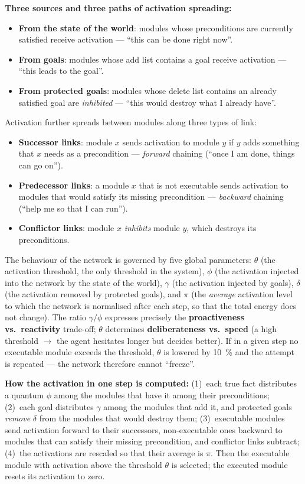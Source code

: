 \documentclass[11pt,a4paper]{article}
\theoremstyle{definition}
\providecommand{\uv}[1]{``#1''}
\begin{document}
\textbf{Three sources and three paths of activation spreading:}
\begin{itemize}
\item \textbf{From the state of the world}: modules whose preconditions are currently satisfied
  receive activation --- \uv{this can be done right now}.
\item \textbf{From goals}: modules whose add list contains a goal receive activation ---
  \uv{this leads to the goal}.
\item \textbf{From protected goals}: modules whose delete list contains an already satisfied goal are
  \emph{inhibited} --- \uv{this would destroy what I already have}.
\end{itemize}
Activation further spreads between modules along three types of link:
\begin{itemize}
\item \textbf{Successor links}: module $x$ sends activation to module $y$ if $y$ adds something that
  $x$ needs as a precondition --- \emph{forward} chaining (\uv{once I am done, things can go on}).
\item \textbf{Predecessor links}: a module $x$ that is not executable sends activation to modules
  that would satisfy its missing precondition --- \emph{backward} chaining (\uv{help me so that I can
  run}).
\item \textbf{Conflictor links}: module $x$ \emph{inhibits} module $y$, which destroys its
  preconditions.
\end{itemize}
The behaviour of the network is governed by five global parameters: $\theta$ (the activation
threshold, the only threshold in the system), $\phi$ (the activation injected into the network by the
state of the world), $\gamma$ (the activation injected by goals), $\delta$ (the activation removed by
protected goals), and $\pi$ (the \emph{average} activation level to which the network is normalised
after each step, so that the total energy does not change).
The ratio $\gamma/\phi$ expresses precisely the \textbf{proactiveness vs.\ reactivity} trade-off;
$\theta$ determines \textbf{deliberateness vs.\ speed} (a high threshold $\to$ the agent hesitates
longer but decides better). If in a given step no executable module exceeds the threshold, $\theta$
is lowered by 10~\% and the attempt is repeated --- the network therefore cannot \uv{freeze}.

\textbf{How the activation in one step is computed:} (1)~each true fact distributes a quantum
$\phi$ among the modules that have it among their preconditions; (2)~each goal distributes
$\gamma$ among the modules that add it, and protected goals \emph{remove} $\delta$ from the
modules that would destroy them; (3)~executable modules send activation forward to their
successors, non-executable ones backward to modules that can satisfy their missing
precondition, and conflictor links subtract; (4)~the activations are rescaled so that their
average is $\pi$. Then the executable module with activation above the threshold $\theta$ is
selected; the executed module resets its activation to zero.
\end{document}
